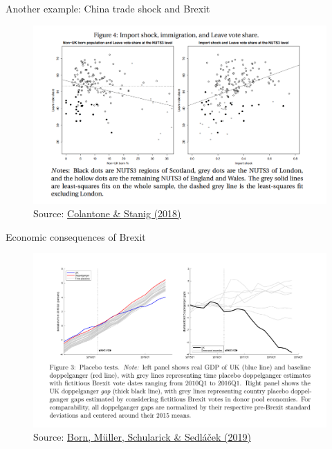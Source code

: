 \documentclass[notes,11pt, aspectratio=169, xcolor=table]{beamer}
\begin{document}
\begin{frame}{Another example: China trade shock and Brexit}

\begin{figure}
    \centering
    \includegraphics[width=0.75\linewidth]{figs/brexit-trade-shock.png}  
    \caption{Source: \href{https://www.cambridge.org/core/journals/american-political-science-review/article/abs/global-competition-and-brexit/C843990101DB9232B654E77130F88398}{Colantone \& Stanig (2018)}}
\end{figure}

\end{frame}

\begin{frame}{Economic consequences of Brexit}

\begin{figure}
    \centering
    \includegraphics[width=0.75\linewidth]{figs/brexit-sc.png}  
    \caption{Source: \href{https://https://academic.oup.com/ej/article-abstract/129/623/2722/5506774}{Born, Müller, Schularick \& Sedláček (2019)}}
\end{figure}

\end{frame}
\end{document}
